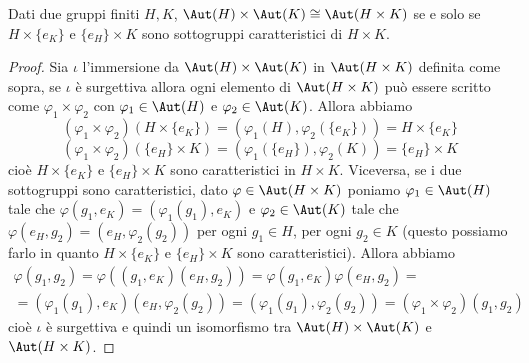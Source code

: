 \documentclass[11pt]{scrartcl}
\begin{document}
\begin{itemize}
\end{itemize}

\begin{proposition}
    Dati due gruppi finiti $H, K$, $\Aut(H)\times \Aut(K)\cong \Aut(H\times K)$
    se e solo se $H\times \{e_K\}$ e $\{e_H\}\times K$ sono sottogruppi 
    caratteristici di $H\times K$.
\end{proposition}

\begin{proof}
    Sia $\iota$ l'immersione da $\Aut(H)\times \Aut(K)$ in $\Aut(H\times K)$ 
    definita come sopra, se $\iota$ è surgettiva allora ogni elemento di 
    $\Aut(H\times K)$ può essere scritto come $\varphi_1\times\varphi_2$ con
    $\varphi_1 \in \Aut(H)$ e $\varphi_2 \in \Aut(K)$. Allora abbiamo 
    \[
        (\varphi_1\times\varphi_2)(H\times\{e_K\}) = 
        (\varphi_1(H), \varphi_2(\{e_K\})) = H\times\{e_K\}
    \]
    \[
        (\varphi_1\times \varphi_2)(\{e_H\}\times K) = 
        (\varphi_1(\{e_H\}), \varphi_2(K)) = \{e_H\}\times K
    \]cioè $H\times\{e_K\}$ e $\{e_H\}\times K$ sono caratteristici in
    $H\times K$. Viceversa, se i due sottogruppi sono caratteristici, dato
    $\varphi \in \Aut(H\times K)$ poniamo $\varphi_1 \in \Aut(H)$ tale che 
    $\varphi(g_1, e_K) = (\varphi_1(g_1), e_K)$ e $\varphi_2 \in \Aut(K)$ 
    tale che $\varphi(e_H, g_2) = (e_H, \varphi_2(g_2))$ per ogni $g_1 \in H$,
    per ogni $g_2 \in K$ (questo possiamo farlo in quanto $H\times\{e_K\}$ 
    e $\{e_H\}\times K$ sono caratteristici). Allora abbiamo 
    \begin{multline*}
        \varphi(g_1, g_2) = \varphi((g_1, e_K)(e_H, g_2)) = 
        \varphi(g_1, e_K)\varphi(e_H, g_2) = \\
        = (\varphi_1(g_1), e_K)(e_H, \varphi_2(g_2)) = 
        (\varphi_1(g_1), \varphi_2(g_2)) = (\varphi_1\times\varphi_2)(g_1, g_2)
    \end{multline*}cioè $\iota$ è surgettiva e quindi un isomorfismo tra
    $\Aut(H)\times \Aut(K)$ e $\Aut(H\times K)$.
\end{proof}
\end{document}
